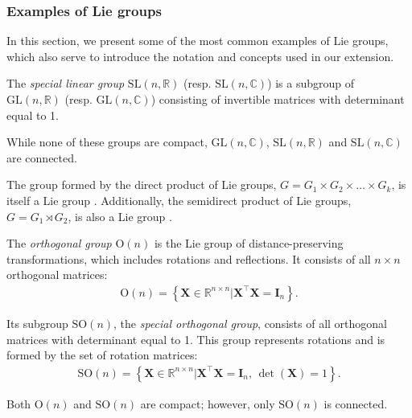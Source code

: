 \subsubsection{Examples of Lie groups}
In this section, we present some of the most common examples of Lie groups, which also serve to introduce the notation and concepts used in our extension.
\begin{example}\label{ex:general-linear-group-special-linear-group}
    The \emph{special linear group} $\text{SL}(n, \mathbb{R})$ (resp. $\text{SL}(n, \mathbb{C})$) is a subgroup of $\text{GL}(n, \mathbb{R})$ (resp. $\text{GL}(n, \mathbb{C})$) consisting of invertible matrices with determinant equal to 1.

    While none of these groups are compact, $\text{GL}(n, \mathbb{C})$, $\text{SL}(n, \mathbb{R})$ and $\text{SL}(n, \mathbb{C})$ are connected.
\end{example}
\begin{example}
    The group formed by the direct product of Lie groups, $G = G_1 \times G_2 \times \dots \times G_k$, is itself a Lie group \citep[p. 152]{Lee2012}. Additionally, the semidirect product of Lie groups, $G = G_1\rtimes G_2$, is also a Lie group \citep[p. 168]{Lee2012}.
\end{example}
\begin{example}\label{ex:orthogonal-group-special-orthogonal-group}
    The \emph{orthogonal group} $\text{O}(n)$ is the Lie group of distance-preserving transformations, which includes rotations and reflections. It consists of all $n\times n$ orthogonal matrices:
    \begin{align}
        \text{O}(n) = \left\{\mathbf{X}\in\mathbb{R}^{n\times n} | \mathbf{X}^\top\mathbf{X} = \mathbf{I}_n\right\}.
    \end{align}

    Its subgroup $\text{SO}(n)$, the \emph{special orthogonal group}, consists of all orthogonal matrices with determinant equal to 1. This group represents rotations and is formed by the set of rotation matrices:
    \begin{align}
        \text{SO}(n) = \left\{\mathbf{X}\in\mathbb{R}^{n\times n} | \mathbf{X}^\top\mathbf{X} = \mathbf{I}_n,\, \det(\mathbf{X}) = 1\right\}.
    \end{align}

    Both $\text{O}(n)$ and $\text{SO}(n)$ are compact; however, only $\text{SO}(n)$ is connected.
\end{example}
